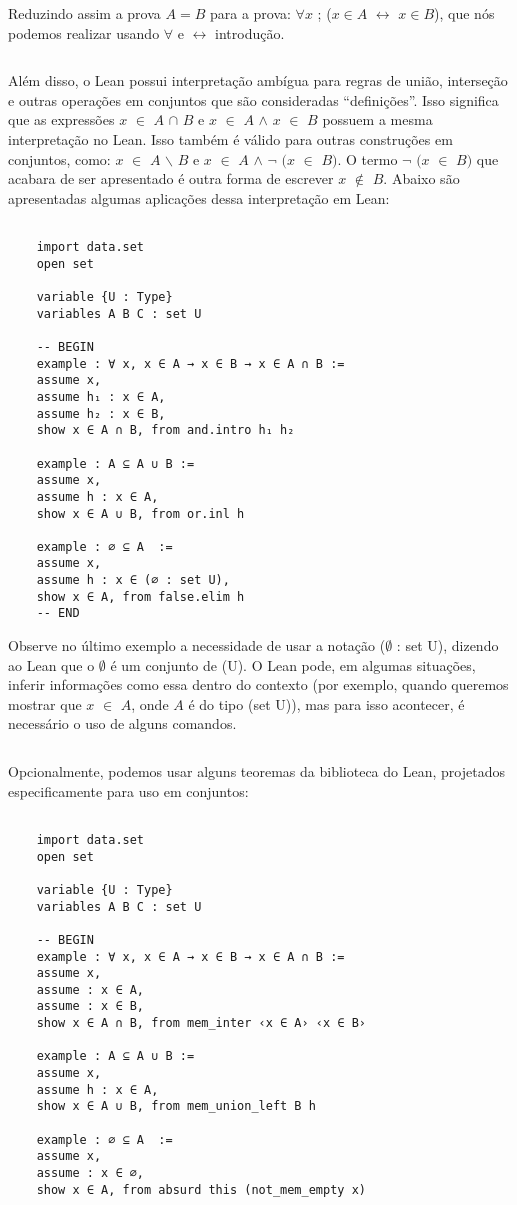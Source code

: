 Reduzindo assim a prova $A = B$ para a prova: $\forall x$ ; ($x \in A$ $\leftrightarrow$ $x \in B$), que nós podemos realizar usando $\forall$ e $\leftrightarrow$ introdução.

$\qquad$

Além disso, o Lean possui interpretação ambígua para regras de união, interseção e outras operações em conjuntos que são consideradas “definições”. Isso significa que as expressões $x$ $\in$ $A$ $\cap$ $B$ e $x$ $\in$ $A$ $\wedge$ $x$ $\in$ $B$ possuem a mesma interpretação no Lean. Isso também é válido para outras construções em conjuntos, como: $x$ $\in$ $A$ $\backslash $ $B$ e $x$ $\in$ $A$ $\wedge$ $\neg$ $(x$ $\in$ $B)$. O termo $\neg$ $(x$ $\in$ $B)$ que acabara de ser apresentado é outra forma de escrever $x$ $\notin$ $B$. Abaixo são apresentadas algumas aplicações dessa interpretação em Lean:
\begin{lstlisting}

    import data.set
    open set

    variable {U : Type}
    variables A B C : set U

    -- BEGIN
    example : ∀ x, x ∈ A → x ∈ B → x ∈ A ∩ B :=
    assume x,
    assume h₁ : x ∈ A,
    assume h₂ : x ∈ B,
    show x ∈ A ∩ B, from and.intro h₁ h₂

    example : A ⊆ A ∪ B :=
    assume x,
    assume h : x ∈ A,
    show x ∈ A ∪ B, from or.inl h

    example : ∅ ⊆ A  :=
    assume x,
    assume h : x ∈ (∅ : set U),
    show x ∈ A, from false.elim h
    -- END

\end{lstlisting}

Observe no último exemplo a necessidade de usar a notação {
\selectfont ($\emptyset$ : set U)}, dizendo ao Lean que o $\emptyset$ é um conjunto de {
\selectfont (U)}. O Lean pode, em algumas situações, inferir informações como essa dentro do contexto (por exemplo, quando queremos mostrar que $x$ $\in$ $A$, onde $A$ é do tipo {
\selectfont (set U)}), mas para isso acontecer, é necessário o uso de alguns comandos.

$\qquad$

Opcionalmente, podemos usar alguns teoremas da biblioteca do Lean, projetados especificamente para uso em conjuntos:
\begin{lstlisting}

    import data.set
    open set

    variable {U : Type}
    variables A B C : set U

    -- BEGIN
    example : ∀ x, x ∈ A → x ∈ B → x ∈ A ∩ B :=
    assume x,
    assume : x ∈ A,
    assume : x ∈ B,
    show x ∈ A ∩ B, from mem_inter ‹x ∈ A› ‹x ∈ B›

    example : A ⊆ A ∪ B :=
    assume x,
    assume h : x ∈ A,
    show x ∈ A ∪ B, from mem_union_left B h

    example : ∅ ⊆ A  :=
    assume x,
    assume : x ∈ ∅,
    show x ∈ A, from absurd this (not_mem_empty x)
 
\end{lstlisting}

